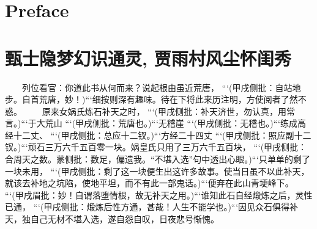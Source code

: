 \documentclass[
    ref = refDemo.bib,
    coverpage = cover.pdf,
    geometry = b5,
    lang = cn
]{spBook}
\date{\today}
\begin{document}
    \frontmatter
    \maketitle
    \tableofcontents
    \chapter{Preface}
    \lipsum[1-10]

    \mainmatter
    \chapter{\small{甄士隐梦幻识通灵, 贾雨村风尘怀闺秀}}
    　　列位看官：你道此书从何而来？说起根由虽近荒唐， ```(甲戌侧批：自站地步。自首荒唐，妙！)```细按则深有趣味。待在下将此来历注明，方使阅者了然不惑。  
    　　原来女娲氏炼石补天之时， ```(甲戌侧批：补天济世，勿认真，用常言。)```于大荒山 ```(甲戌侧批：荒唐也。)```无稽崖 ```(甲戌侧批：无稽也。)```练成高经十二丈、 ```(甲戌侧批：总应十二钗。)```方经二十四丈 ```(甲戌侧批：照应副十二钗。)```顽石三万六千五百零一块。娲皇氏只用了三万六千五百块， ```(甲戌侧批：合周天之数。蒙侧批：数足，偏遗我。“不堪入选”句中透出心眼。)```只单单的剩了一块未用， ```(甲戌侧批：剩了这一块便生出这许多故事。使当日虽不以此补天，就该去补地之坑陷，使地平坦，而不有此一部鬼话。)```便弃在此山青埂峰下。 ```(甲戌眉批：妙！自谓落堕情根，故无补天之用。)```谁知此石自经煅炼之后，灵性已通， ```(甲戌侧批：煅炼后性方通，甚哉！人生不能学也。)```因见众石俱得补天，独自己无材不堪入选，遂自怨自叹，日夜悲号惭愧。  
\end{document}
